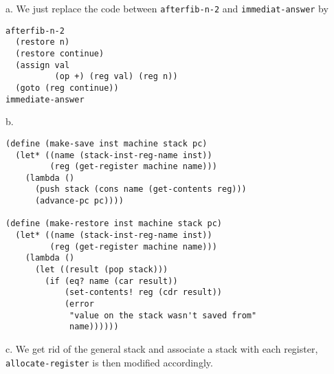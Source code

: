 \documentclass[a4paper,12pt]{article}
\newcommand{\subpar}[1]{\medskip \noindent #1.}
\begin{document}
\subpar{a} We just replace the code between \lstinline!afterfib-n-2!
and \lstinline!immediat-answer! by

\begin{lstlisting}
afterfib-n-2
  (restore n)
  (restore continue)
  (assign val
          (op +) (reg val) (reg n))
  (goto (reg continue))
immediate-answer
\end{lstlisting}

\subpar{b}

\begin{lstlisting}
(define (make-save inst machine stack pc)
  (let* ((name (stack-inst-reg-name inst))
         (reg (get-register machine name)))
    (lambda ()
      (push stack (cons name (get-contents reg)))
      (advance-pc pc))))

(define (make-restore inst machine stack pc)
  (let* ((name (stack-inst-reg-name inst))
         (reg (get-register machine name)))
    (lambda ()
      (let ((result (pop stack)))
        (if (eq? name (car result))
            (set-contents! reg (cdr result))
            (error
             "value on the stack wasn't saved from"
             name))))))
\end{lstlisting}

\subpar{c} We get rid of the general stack and associate a stack with
each register, \lstinline!allocate-register! is then modified
accordingly.
\end{document}

